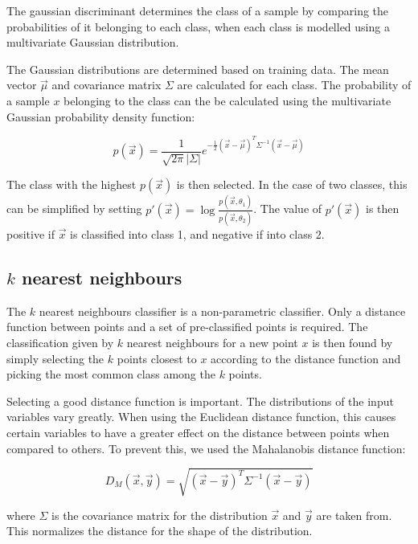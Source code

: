 \documentclass[twoside]{article}
\renewcommand{\v}[1]{\vec{#1}}
\begin{document}
\begin{multicols}{2}
The gaussian discriminant determines the class of a sample by
comparing the probabilities of it belonging to each class, when each
class is modelled using a multivariate Gaussian distribution.

The Gaussian distributions are determined based on training data.
The mean vector $\v{\mu}$ and covariance matrix $\Sigma$ are calculated for each class.
The probability of a sample $x$ belonging to the class can the be calculated
using the multivariate Gaussian probability density function:

\begin{equation}
 p(\v{x}) = \frac{1}{\sqrt{2\pi} |\Sigma|}e^{-\frac{1}{2}(\v{x}-\v{\mu})^T \Sigma^{-1} (\v{x}-\v{\mu})}
\end{equation}

The class with the highest $p(\v{x})$ is then selected. In the case of two classes,
this can be simplified by setting
$p'(\v{x}) = \log \frac{p(\v{x},\theta_1)}{p(\v{x},\theta_2)}$.
The value of $p'(\v{x})$ is then positive if $\v{x}$ is classified into class 1,
and negative if into class 2. 

\subsection{$k$ nearest neighbours}

The $k$ nearest neighbours classifier is a non-parametric classifier. Only a
distance function between points and a set of pre-classified points is required.
The classification given by $k$ nearest neighbours for a new point $x$ is then found by simply
selecting the $k$ points closest to $x$ according to the distance function and
picking the most common class among the $k$ points.

Selecting a good distance function is important. The distributions of the
input variables vary greatly. When using the Euclidean distance function,
this causes certain variables to have a greater effect on the distance between
points when compared to others. To prevent this, we used the Mahalanobis
distance function\cite[p.~88]{Alpaydin}:

\begin{equation}\label{eq:mahalanobis}
  D_M(\v{x}, \v{y}) = \sqrt{(\v{x}-\v{y})^T \Sigma^{-1} (\v{x}-\v{y})}
\end{equation}

where $\Sigma$ is the covariance matrix for the 
distribution $\v{x}$ and $\v{y}$ are taken from.
This normalizes the distance for the shape of the distribution.


\end{multicols}
\end{document}
